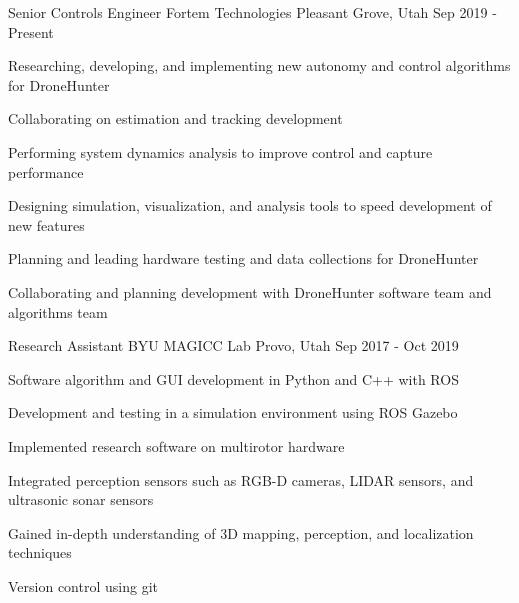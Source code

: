 
\begin{cventries}

\cventry
  {Senior Controls Engineer}
  {Fortem Technologies}
  {Pleasant Grove, Utah}
  {Sep 2019 - Present}
  {
    \begin{cvitems}
      \item{Researching, developing, and implementing new autonomy and control algorithms for DroneHunter}
      \item{Collaborating on estimation and tracking development}
      \item{Performing system dynamics analysis to improve control and capture performance}
      \item{Designing simulation, visualization, and analysis tools to speed development of new features}
      \item{Planning and leading hardware testing and data collections for DroneHunter}
      \item{Collaborating and planning development with DroneHunter software team and algorithms team}
    \end{cvitems}
  }

\cventry
  {Research Assistant} %
  {BYU MAGICC Lab} %
  {Provo, Utah} %
  {Sep 2017 - Oct 2019} %
  {
    \begin{cvitems} %
      \item{Software algorithm and GUI development in Python and C++ with ROS}
      \item{Development and testing in a simulation environment using ROS Gazebo}
      \item{Implemented research software on multirotor hardware}
      \item{Integrated perception sensors such as RGB-D cameras, LIDAR sensors, and ultrasonic sonar sensors}
      \item{Gained in-depth understanding of 3D mapping, perception, and localization techniques}
      \item{Version control using git}
    \end{cvitems}
  }


\end{cventries}
